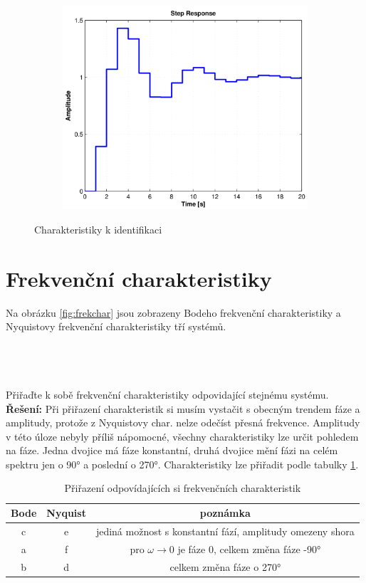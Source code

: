 \documentclass[twoside]{article}
\begin{document}
\begin{figure}[htbp]
\begin{subfigure}{0.25\textwidth}
	\includegraphics[width=\linewidth]{zadani11-f}
  \label{fig:charakteristiky:f}
  \caption{}
\end{subfigure}
\caption{Charakteristiky k identifikaci}
\label{fig:charakteristiky}
\end{figure}

\newpage

\section{Frekvenční charakteristiky}
\label{sec:ukol12}
Na obrázku \ref{fig:frekchar} jsou zobrazeny Bodeho frekvenční charakteristiky a Nyquistovy frekvenční charakteristiky tří systémů.
\subsection{~}
Přiřaďte k sobě frekvenční charakteristiky odpovidající stejnému systému. \\
\textbf{Řešení:} Při přiřazení charakteristik si musím vystačit s obecným trendem fáze a amplitudy, protože z Nyquistovy char. nelze odečíst přesná frekvence.
Amplitudy v této úloze nebyly příliš nápomocné, všechny charakteristiky lze určit pohledem na fáze. Jedna dvojice má fáze konstantní,
druhá dvojice mění fázi na celém spektru jen o 90° a poslední o 270°.
Charakteristiky lze přiřadit podle tabulky \ref{tab:charakteristiky}.
\begin{table}[htbp]
	\centering
	\begin{tabular}{c|c|c}
		Bode & Nyquist & poznámka \\
		\hline
		c & e & jediná možnost s konstantní fází, amplitudy omezeny shora \\
		a & f & pro $\omega \rightarrow 0$ je fáze 0, celkem změna fáze -90° \\
		b & d & celkem změna fáze o 270°
	\end{tabular}
	\caption{Přiřazení odpovídajících si frekvenčních charakteristik}
	\label{tab:charakteristiky}
\end{table}
\end{document}
